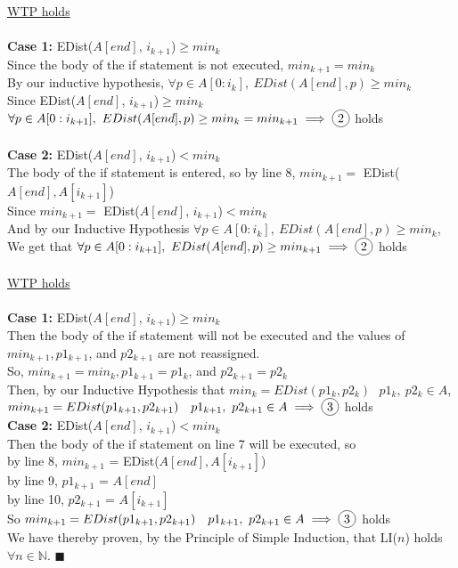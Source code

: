\documentclass{article}
\newcommand{\N}{\mathbb{N}}
\DeclareRobustCommand*\circled[1]{\tikz[baseline =(char.base)]{\node[shape=circle, draw, inner sep = 2pt] (char) {#1};}}
\begin{document}
\begin{enumerate}
	
	\underline{WTP \circled{2} holds}\\\\
	\textbf{Case 1:} EDist($A[end]$, $i_{k+1}$)$ \geq min_k$\\
	
	Since the body of the if statement is not executed, $min_{k+1} = min_k$\\
	By our inductive hypothesis, $\forall p \in A[0:i_k],\ EDist(A[end],p) \geq min_k$\\
	Since EDist($A[end]$, $i_{k+1}$)$ \geq min_k$\\
	$\forall p \in A[0:i_{k+1}],\ EDist(A[end],p) \geq min_k = min_{k+1} \implies \circled{2}$ holds\\\\
	
	\textbf{Case 2:} EDist($A[end]$, $i_{k+1}$)$ < min_k$\\
	The body of the if statement is entered, so by line 8, $min_{k+1}=$ EDist($A[end],A[i_{k+1}]$)\\
	Since $min_{k+1} =$ EDist($A[end]$, $i_{k+1}$)$ < min_k$\\
	And by our Inductive Hypothesis $\forall p \in A[0:i_k],\ EDist(A[end],p) \geq min_k$,\\
	We get that 	$\forall p \in A[0:i_{k+1}],\ EDist(A[end],p) \geq min_{k+1} \implies \circled{2}$ holds\\\\
	
	\underline{WTP \circled{3} holds}\\\\
	\textbf{Case 1:} EDist($A[end]$, $i_{k+1}$)$ \geq min_k$\\
	Then the body of the if statement will not be executed and the values of $min_{k+1}, p1_{k+1}$, and $ p2_{k+1}$ are not reassigned.\\
	 So, $min_{k+1}= min_k, p1_{k+1} = p1_k$, and $ p2_{k+1}=p2_k$\\
	Then, by our Inductive Hypothesis that $min_k = EDist(p1_k, p2_k)\ \ \ p1_k,\ p2_k \in A$,\\
	$min_{k+1} = EDist(p1_{k+1}, p2_{k+1})\ \ \ p1_{k+1},\ p2_{k+1} \in A \implies \circled{3}$ holds\\
	
	\textbf{Case 2:} EDist($A[end]$, $i_{k+1}$)$ < min_k$\\
	Then the body of the if statement on line 7 will be executed, so\\
	by line 8, $min_{k+1}$ = EDist($A[end], A[i_{k+1}]$) \\
	by line 9, $p1_{k+1}$ = $A[end]$\\
	by line 10, $p2_{k+1}$ = $A[i_{k+1}]$\\
	So $min_{k+1} = EDist(p1_{k+1}, p2_{k+1})\ \ \ p1_{k+1},\ p2_{k+1} \in A \implies \circled{3}$ holds\\
	
	We have thereby proven, by the Principle of Simple Induction, that LI($n$) holds $\forall n \in \N$. \null\hfill $\blacksquare$ \\\\ 

\end{enumerate}
\end{document}
